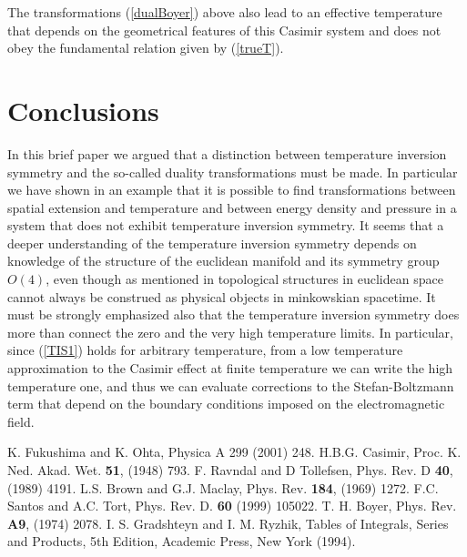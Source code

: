 \documentclass[a4paper,12pt]{article}
\begin{document}
The transformations (\ref{dualBoyer}) above also lead to an effective temperature that depends on the geometrical features of this Casimir system and does not obey the fundamental relation given by (\ref{trueT}).
%
\section{Conclusions}
%
In this brief paper we argued that a distinction between temperature inversion symmetry and the so-called duality transformations must be made. In particular we have shown in an example that it is possible to find transformations between spatial extension and temperature and between energy density and pressure in a system that does not exhibit temperature inversion symmetry. It seems that a deeper understanding of the temperature inversion symmetry depends on knowledge of the structure of the euclidean manifold and its symmetry group $O(4)$, even though as mentioned in \cite{Fukushima&Ohta2001} topological structures in euclidean space cannot always be construed as physical objects in minkowskian spacetime. It must be strongly emphasized also that the temperature inversion symmetry does more than connect the zero and the very high temperature limits. In particular, since (\ref{TIS1}) holds for arbitrary temperature, from a low temperature approximation to the Casimir effect at finite temperature we can write the high temperature one, and thus we can evaluate corrections to the Stefan-Boltzmann term that depend on the boundary conditions imposed  on the electromagnetic field.

%
\begin{thebibliography}{99}
%
 K. Fukushima and K. Ohta, Physica A 299 (2001) 248.
%
 H.B.G. Casimir, Proc. K. Ned. Akad. Wet. {\bf 51}, (1948) 793.
%
 F. Ravndal and D Tollefsen, Phys. Rev. D {\bf 40}, (1989) 4191.
%
 L.S. Brown and G.J. Maclay, Phys. Rev. \textbf{184}, (1969) 1272.
%
 F.C. Santos and A.C. Tort, Phys. Rev. D. \textbf{60} (1999) 105022.
%
 T. H. Boyer, Phys. Rev. {\bf A9}, (1974) 2078.
%
 I. S. Gradshteyn and I. M. Ryzhik, Tables of Integrals, Series and Products, 5th Edition, Academic Press, New York (1994).
%
%
%
%
%
%
%
%
\end{thebibliography}
%
\end{document}
